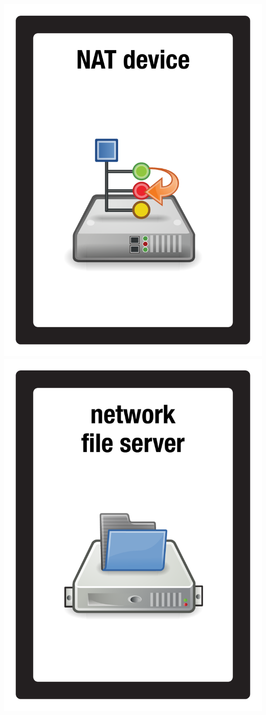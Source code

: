 \documentclass{letter}
\begin{document}
\includegraphics{patch/patch_nat_device}
\includegraphics{patch/patch_network_file_server}
\end{document}
